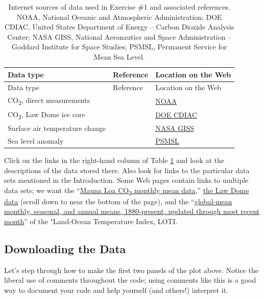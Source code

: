 \documentclass[
  11pt,
]{book}
\begin{document}
\begin{longtable}[]{@{}lll@{}}
\caption{\label{tab:climatedata} Internet sources of data used in Exercise \#1 and associated references. NOAA, National Oceanic and Atmospheric Administration; DOE CDIAC, United States Department of Energy -- Carbon Dioxide Analysis Center; NASA GISS, National Aeronautics and Space Administration -- Goddard Institute for Space Studies; PSMSL, Permanent Service for Mean Sea Level.}\tabularnewline
\toprule
Data type & Reference & Location on the Web\tabularnewline
\midrule
\endfirsthead
\toprule
Data type & Reference & Location on the Web\tabularnewline
\midrule
\endhead
CO\textsubscript{2}, direct measurements & \citet{Keeling1976-bc} & \href{http://www.esrl.noaa.gov/gmd/ccgg/trends/}{NOAA}\tabularnewline
CO\textsubscript{2}, Law Dome ice core & \citet{MacFarling_Meure2006-wa} & \href{http://cdiac.ornl.gov/trends/co2/modern_co2.html}{DOE CDIAC}\tabularnewline
Surface air temperature change & \citet{Hansen2010-wg} & \href{http://data.giss.nasa.gov/gistemp/}{NASA GISS}\tabularnewline
Sea level anomaly & \citet{Jevrejeva2014-my} & \href{http://www.psmsl.org/products/reconstructions/jevrejevaetal2014.php}{PSMSL}\tabularnewline
\bottomrule
\end{longtable}

Click on the links in the right-hand column of Table \ref{tab:climatedata} and look at the descriptions of the data stored there. Also look for links to the particular data sets mentioned in the Introduction. Some Web pages contain links to multiple data sets; we want the \enquote{\href{ftp://aftp.cmdl.noaa.gov/products/trends/co2/co2_mm_mlo.txt}{Mauna Loa CO\textsubscript{2} monthly mean data},} \href{ftp://ftp.ncdc.noaa.gov/pub/data/paleo/icecore/antarctica/law/law2006.txt}{the Law Dome data} (scroll down to near the bottom of the page), and the \enquote{\href{http://data.giss.nasa.gov/gistemp/tabledata_v3/GLB.Ts+dSST.txt}{global-mean monthly, seasonal, and annual means, 1880-present, updated through most recent month}} of the "Land-Ocean Temperature Index, LOTI.

\hypertarget{downloading-the-data}{%
\subsection{Downloading the Data}\label{downloading-the-data}}

Let's step through how to make the first two panels of the plot above. Notice the liberal use of comments throughout the code; using comments like this is a good way to document your code and help yourself (and others!) interpret it.
\end{document}
